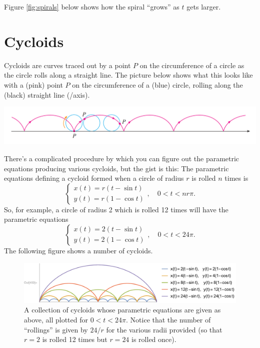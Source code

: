 \documentclass[12pt]{article}
\begin{document}
	\noindent Figure \ref{fig:spirals} below shows how the spiral ``grows'' as $t$ gets larger.

	
	\section*{Cycloids}
	Cycloids are curves traced out by a point $P$ on the circumference of a circle as the circle rolls along a straight line. The picture below shows what this looks like with a (pink) point $P$ on the circumference of a (blue) circle, rolling along the (black) straight line (/axis).
	\begin{center}
		\includegraphics[trim={6mm 6mm 6mm 6mm}, clip, scale=0.5]{5_Cycloids}
	\end{center}
	There's a complicated procedure by which you can figure out the parametric equations producing various cycloids, but the gist is this: The parametric equations defining a cycloid formed when a circle of radius $r$ is rolled $n$ times is
	$$\left\{
		\begin{array}{l}
		x(t)=r(t-\sin{t})\\
		y(t)=r(1-\cos{t})
		\end{array}
	\right.,\quad0 < t < nr\pi.$$
	So, for example, a circle of radius 2 which is rolled 12 times will have the parametric equations
	$$\left\{
		\begin{array}{l}
		x(t)=2(t-\sin{t})\\
		y(t)=2(1-\cos{t})
		\end{array}
	\right.,\quad0 < t < 24\pi.$$
	The following figure shows a number of cycloids.
	\begin{figure}[h!]
		\begin{center}
			\includegraphics[trim={16mm 0 0 -6mm}, clip, scale=0.75]{5_Cycloids2}
			\caption{A collection of cycloids whose parametric equations are given as above, all plotted for $0<t<24\pi$. Notice that the number of ``rollings'' is given by $24/r$ for the various radii provided (so that $r=2$ is rolled 12 times but $r=24$ is rolled once).}
		\end{center}
	\end{figure}
	\vspace{-8mm}
	
\end{document}
